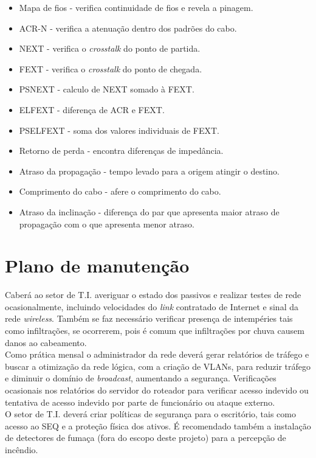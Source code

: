 \documentclass[	DIV=calc,%
							paper=a4,%
							fontsize=12pt,%
							onecolumn]{scrartcl}	 					%
\begin{document}
\begin{itemize}
\item Mapa de fios - verifica continuidade de fios e revela a pinagem. 
\item ACR-N - verifica a atenuação dentro dos padrões do cabo.
\item NEXT - verifica o \textit{crosstalk} do ponto de partida.
\item FEXT - verifica o \textit{crosstalk} do ponto de chegada.
\item PSNEXT - calculo de NEXT somado à FEXT.
\item ELFEXT - diferença de ACR e FEXT.
\item PSELFEXT - soma dos valores individuais de FEXT.
\item Retorno de perda - encontra diferenças de impedância.
\item Atraso da propagação - tempo levado para a origem atingir o destino.
\item Comprimento do cabo - afere o comprimento do cabo.
\item Atraso da inclinação - diferença do par que apresenta maior atraso de propagação com o que apresenta menor atraso.
\end{itemize}


\section{Plano de manutenção}

Caberá ao setor de T.I. averiguar o estado dos passivos e realizar testes de rede ocasionalmente, incluindo velocidades do \textit{link} contratado de Internet e sinal da rede \textit{wireless}. Também se faz necessário verificar presença de intempéries tais como infiltrações, se ocorrerem, pois é comum que infiltrações por chuva causem danos ao cabeamento. 
\\

Como prática mensal o administrador da rede deverá gerar relatórios de tráfego e buscar a otimização da rede lógica, com a criação de VLANs, para reduzir tráfego e diminuir o domínio de \textit{broadcast}, aumentando a segurança. Verificações ocasionais nos relatórios do servidor do roteador para verificar acesso indevido ou tentativa de acesso indevido por parte de funcionário ou ataque externo.
\\

O setor de T.I. deverá criar políticas de segurança para o escritório, tais como acesso ao SEQ e a proteção física dos ativos. É recomendado também a instalação de detectores de fumaça (fora do escopo deste projeto) para a percepção de incêndio.
\end{document}
